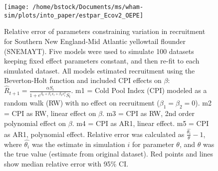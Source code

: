 \documentclass[]{article}
\begin{document}
\begin{landscape}
\begin{figure}

{\centering \texttt{[image: /home/bstock/Documents/ms/wham-sim/plots/into\_paper/estpar\_Ecov2\_OEPE]} 

}

\caption{Relative error of parameters constraining variation in recruitment for Southern New England-Mid Atlantic yellowtail flounder (SNEMAYT). Five models were used to simulate 100 datasets keeping fixed effect parameters constant, and then re-fit to each simulated dataset. All models estimated recruitment using the Beverton-Holt function and included CPI effects on $\beta$: $\hat{R}_{t+1} = \frac{\alpha S_{t}}{1 + e^{\beta_0 + \beta_1 x_{t} + \beta_2 x^2_{t}} S_t}$. m1 = Cold Pool Index (CPI) modeled as a random walk (RW) with no effect on recruitment ($\beta_1 = \beta_2 = 0$). m2 = CPI as RW, linear effect on $\beta$. m3 = CPI as RW, 2nd order polynomial effect on $\beta$. m4 = CPI as AR1, linear effect. m5 = CPI as AR1, polynomial effect. Relative error was calculated as $\frac{\hat{\theta_i}}{\theta} - 1$, where $\hat{\theta_i}$ was the estimate in simulation $i$ for parameter $\theta$, and $\theta$ was the true value (estimate from original dataset). Red points and lines show median relative error with 95\% CI.}\label{fig:estpar-ecov}
\end{figure}
\end{landscape}
\end{document}
